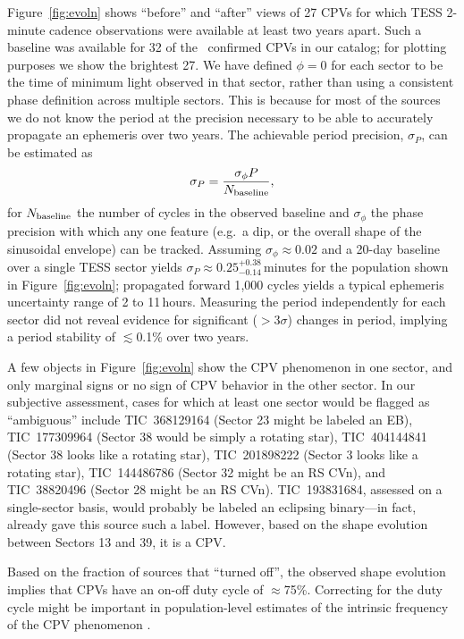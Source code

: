 \documentclass[11pt,twocolumn,tighten]{aastex63}
\begin{document}
Figure~\ref{fig:evoln} shows ``before'' and ``after'' views of 27 CPVs
for which TESS 2-minute cadence observations were available at least
two years apart.  Such a baseline was available for 32 of the \ngoods\
confirmed CPVs in our catalog; for plotting purposes we show the
brightest 27.  We have defined $\phi=0$ for each sector to be the time
of minimum light observed in that sector, rather than using a
consistent phase definition across multiple sectors.  This is because
for most of the sources we do not know the period at the precision
necessary to be able to accurately propagate an ephemeris over two
years.  The achievable period precision, $\sigma_P$, can be estimated
as
\begin{equation}
  \sigma_{P} = \frac { \sigma_{\phi} P } { N_{\rm baseline} },
  \label{eq:periodprecision}
\end{equation}
for $N_{\rm baseline}$ the number of cycles in the observed baseline
and $\sigma_{\phi}$ the phase precision with which any one feature
(e.g.~a dip, or the overall shape of the sinusoidal envelope) can be
tracked.  Assuming $\sigma_\phi$$\approx$$0.02$ and a 20-day baseline
over a single TESS sector yields
$\sigma_{P}$$\approx$$0.25^{+0.38}_{-0.14}$\,minutes for the
population shown in Figure~\ref{fig:evoln}; propagated forward 1{,}000
cycles yields a typical ephemeris uncertainty range of 2 to 11\,hours.
Measuring the period independently for each sector did not reveal
evidence for significant ($>$3$\sigma$) changes in period, implying a
period stability of $\lesssim$0.1\% over two years.

A few objects in Figure~\ref{fig:evoln} show the CPV phenomenon in one
sector, and only marginal signs or no sign of CPV behavior in the
other sector.  In our subjective assessment, cases for which at least
one sector would be flagged as ``ambiguous'' include
TIC~368129164 (Sector 23 might be labeled an EB),
TIC~177309964 (Sector 38 would be simply a rotating star),
TIC~404144841 (Sector 38 looks like a rotating star),
TIC~201898222 (Sector 3 looks like a rotating star),
TIC~144486786 (Sector 32 might be an RS CVn),
and
TIC~38820496 (Sector 28 might be an RS CVn).
TIC~193831684, assessed on a single-sector basis, would probably be
labeled an eclipsing binary---in fact, \citet{2021ApJ...912..123J}
already gave this source such a label.  However, based on the shape
evolution between Sectors 13 and 39, it is a CPV.

Based on the fraction of sources that ``turned off'', the
observed shape evolution implies that CPVs have an on-off duty cycle
of $\approx$75\%.  Correcting for the duty cycle might be important in
population-level estimates of the intrinsic frequency of the CPV
phenomenon \citep[e.g.][]{2022AJ....163..144G}.
\end{document}
